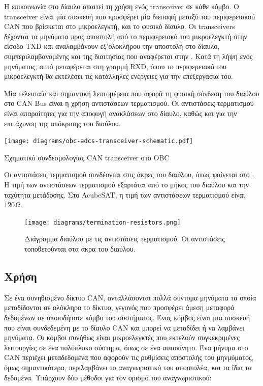 \documentclass[a4paper,nobib,justified]{tufte-book}
\begin{document}
Η επικοινωνία στο δίαυλο απαιτεί τη χρήση ενός transceiver σε κάθε κόμβο. Ο transceiver είναι μία συσκευή που προσφέρει μία διεπαφή μεταξύ του περιφερειακού CAN που βρίσκεται στο μικροελεγκτή, και το φυσικό δίαυλο. Οι transceivers δέχονται τα μηνύματα προς αποστολή από το περιφερειακό του μικροελεγκτή στην είσοδο TXD και αναλαμβάνουν εξ'ολοκλήρου την αποστολή στο δίαυλο, συμπεριλαμβανομένης και της διαιτησίας που αναφέρεται στην .
Κατά τη λήψη ενός μηνύματος, αυτό μεταφέρεται στη γραμμή RXD, όπου το περιφερειακό του μικροελεγκτή θα εκτελέσει τις κατάλληλες ενέργειες για την επεξεργασία του.

Μία τελευταία και σημαντική λεπτομέρεια που αφορά τη φυσική σύνδεση του διαύλου στο CAN Bus είναι η χρήση αντιστάσεων τερματισμού. Οι αντιστάσεις τερματισμού είναι απαραίτητες για την αποφυγή ανακλάσεων στο δίαυλο, καθώς και για την επιτάχυνση της απόκρισης του διαύλου.\begin{marginfigure}
	\texttt{[image: diagrams/obc-adcs-transceiver-schematic.pdf]}
	\label{fig:transceiver-schematic}
	\caption[Σχηματικό συνδεσμολογίας CAN transceiver]{Σχηματικό συνδεσμολογίας CAN transceiver στο OBC}
\end{marginfigure} Οι αντιστάσεις τερματισμού συνδέονται στις άκρες του διαύλου, όπως φαίνεται στο . Η τιμή των αντιστάσεων τερματισμού εξαρτάται από το μήκος του διαύλου και την ταχύτητα μετάδοσης. 
 Στο AcubeSAT, η τιμή των αντιστάσεων τερματισμού είναι $120\Omega$.

\begin{figure}
	\texttt{[image: diagrams/termination-resistors.png]}
	\label{fig:termination-resistors}
	\caption[Διάγραμμα διαύλου με τις αντιστάσεις τερματισμού]{Διάγραμμα διαύλου με τις αντιστάσεις τερματισμού. Οι αντιστάσεις τοποθετούνται στα άκρα του διαύλου.}	
\end{figure}

\subsection{Χρήση}
\label{subsection:can-usage}
Σε ένα συνηθισμένο δίκτυο CAN, ανταλλάσονται πολλά σύντομα μηνύματα τα οποία μεταδίδονται σε ολόκληρο το δίκτυο, γεγονός που προσφέρει άμεση μεταφορά δεδομένων σε οποιοδήποτε κόμβο του συστήματος. Ένας κόμβος είναι μια συσκευή που είναι συνδεδεμένη με το δίαυλο CAN και μπορεί να μεταδίδει ή να λαμβάνει μηνύματα. Οι κόμβοι συνήθως είναι μικροελεγκτές που εκτελούν συγκεκριμένες λειτουργίες σε ένα πολύπλοκο σύστημα, όπως σε ένα αυτοκίνητο. Ένα μήνυμα στο CAN περιέχει μεταδεδομένα που αφορούν τις ρυθμίσεις αποστολής του μηνμύματος, όμως σημαντικότερα, περιλαμβάνει το αναγνωριστικό του αποστολέα, και τα ίδια τα δεδομένα. Υπάρχουν δύο μέθοδοι για τον ορισμό του αναγνωριστικού:
\end{document}
